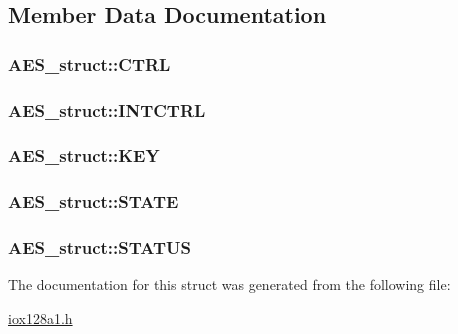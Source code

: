 \subsection{Member Data Documentation}
\hypertarget{struct_a_e_s__struct_a3606c693d6d94220357ea8704772d5b2}{
\subsubsection[{CTRL}]{ {\bf AES\_\-struct::CTRL}}}
\label{struct_a_e_s__struct_a3606c693d6d94220357ea8704772d5b2}
\hypertarget{struct_a_e_s__struct_a6fbc11bf47bb845be97ddb78f5922cac}{
\subsubsection[{INTCTRL}]{ {\bf AES\_\-struct::INTCTRL}}}
\label{struct_a_e_s__struct_a6fbc11bf47bb845be97ddb78f5922cac}
\hypertarget{struct_a_e_s__struct_a46d2e76116d9e16fc3c4f1da1f16872d}{
\subsubsection[{KEY}]{ {\bf AES\_\-struct::KEY}}}
\label{struct_a_e_s__struct_a46d2e76116d9e16fc3c4f1da1f16872d}
\hypertarget{struct_a_e_s__struct_aa8e6c65f1089a1b1f78ca8ae38f0d006}{
\subsubsection[{STATE}]{ {\bf AES\_\-struct::STATE}}}
\label{struct_a_e_s__struct_aa8e6c65f1089a1b1f78ca8ae38f0d006}
\hypertarget{struct_a_e_s__struct_adfcb8ebd854503b6e29f61012b8b30a4}{
\subsubsection[{STATUS}]{ {\bf AES\_\-struct::STATUS}}}
\label{struct_a_e_s__struct_adfcb8ebd854503b6e29f61012b8b30a4}


The documentation for this struct was generated from the following file:\begin{DoxyCompactItemize}
\item 
\hyperlink{iox128a1_8h}{iox128a1.h}\end{DoxyCompactItemize}
